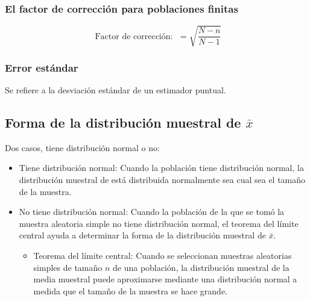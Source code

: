 \documentclass{article}
\begin{document}
\subsubsection{El factor de corrección para poblaciones finitas}
\[
  \text{ Factor de corrección:  }\; = \sqrt{\frac{N-n}{N-1} }
\]

\subsubsection{Error estándar}
Se refiere a la desviación estándar de un estimador puntual.


\subsection{Forma de la distribución muestral de $\bar{x}$ }
Dos casos, tiene distribución normal o no: 
\begin{itemize}
    \item Tiene distribución normal: Cuando la población tiene distribución normal, la distribución muestral de está distribuida normalmente sea cual sea el tamaño de la muestra.
    \item No tiene distribución normal: Cuando la población de la que se tomó la muestra aleatoria simple no tiene distribución normal, el teorema del límite central ayuda a determinar la forma de la distribución muestral de $\bar{x}$.
        \begin{itemize}
            \item Teorema del límite central: Cuando se seleccionan muestras aleatorias simples de tamaño $n$ de una población, la distribución muestral de la media muestral puede aproximarse mediante una distribución normal a medida que el tamaño de la muestra se hace grande. 
        \end{itemize}
\end{itemize}



\end{document}
